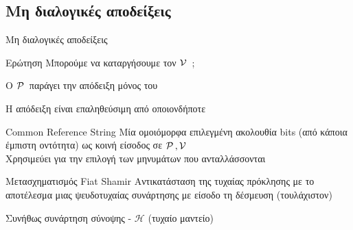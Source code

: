 \documentclass[10pt,handout]{beamer}
\begin{document}

\subsection{Μη διαλογικές αποδείξεις}
\begin{frame}{Μη διαλογικές αποδείξεις}
\begin{block}{Ερώτηση}
Μπορούμε να καταργήσουμε τον $\mathcal{V}\,$ ;
\end{block}

O $\mathcal{P}\,$ παράγει την απόδειξη μόνος του

Η απόδειξη είναι επαληθεύσιμη από οποιονδήποτε

\begin{block}{Common Reference String}
Μία ομοιόμορφα επιλεγμένη ακολουθία bits (από κάποια έμπιστη οντότητα) ως κοινή είσοδος σε $\mathcal{P}\,,\mathcal{V}\,$\\
Χρησιμεύει για την επιλογή των μηνυμάτων που ανταλλάσσονται
\end{block}

\begin{block}{Μετασχηματισμός Fiat Shamir}
Αντικατάσταση της τυχαίας πρόκλησης με το αποτέλεσμα μιας ψευδοτυχαίας συνάρτησης με είσοδο τη δέσμευση (τουλάχιστον)

Συνήθως συνάρτηση σύνοψης - $\mathcal{H}$ (τυχαίο μαντείο)
\end{block}
\end{frame}
\end{document}
